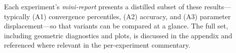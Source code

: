 Each experiment's \emph{mini-report} presents a distilled subset of these
results—typically (A1) convergence percentiles, (A2) accuracy, and (A3)
parameter displacement—so that variants can be compared at a glance.  The full
set, including geometric diagnostics and plots, is discussed in the appendix
and referenced where relevant in the per-experiment commentary.

